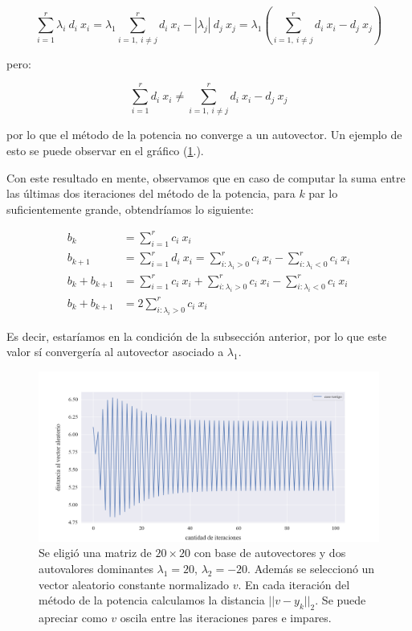 \begin{equation*}
    \sum_{i=1}^{r} \lambda_i\ d_i\ x_i = \lambda_1 \sum_{i = 1,\ i \neq j}^{r} d_i\ x_i - |\lambda_j|\ d_j\ x_j = \lambda_1 (\sum_{i = 1,\ i \neq j}^{r} d_i\ x_i - d_j\ x_j)
\end{equation*}

\vspace{1em} 
\noindent pero:

\begin{equation*}
    \sum_{i=1}^{r} d_i\ x_i \neq \sum_{i = 1,\ i \neq j}^{r} d_i\ x_i - d_j\ x_j
\end{equation*}

\vspace{1em}
\noindent por lo que el método de la potencia no converge a un autovector. 
Un ejemplo de esto se puede observar en el gráfico (\ref{fig:oscilante}.).

\vspace{1em}
Con este resultado en mente, observamos que en caso de computar la suma entre las últimas dos iteraciones del método de la potencia, para $k$ par lo suficientemente grande, obtendríamos lo siguiente:

\vspace{1em}
\begin{align*}
    b_k &= \sum_{i=1}^{r} c_i\ x_i \\
    b_{k+1} &= \sum_{i=1}^{r} d_i\ x_i = \sum_{i: \lambda_i > 0}^{r} c_i\ x_i - \sum_{i: \lambda_i < 0}^{r} c_i\ x_i \\ 
    b_k + b_{k+1} &= \sum_{i=1}^{r} c_i\ x_i + \sum_{i: \lambda_i > 0}^{r} c_i\ x_i - \sum_{i: \lambda_i < 0}^{r} c_i\ x_i   \\ 
    b_k + b_{k+1} &= 2 \sum_{i: \lambda_i > 0}^{r} c_i\ x_i
\end{align*}

\vspace{1em}
Es decir, estaríamos en la condición de la subsección anterior, por lo que este valor sí convergería al autovector asociado a $\lambda_1$.

\begin{figure}[!htbp]
    \includegraphics[scale=0.45]{files/src/.media/op_oscilante.png}
    \caption{Se eligió una matriz de $20 \times 20$ con base de autovectores y dos autovalores dominantes $\lambda_1 = 20$, $\lambda_2 = -20$. Además se seleccionó un vector aleatorio constante normalizado $v$. En cada iteración del método de la potencia calculamos la distancia $||v - y_k||_2$. Se puede apreciar como $v$ oscila entre las iteraciones pares e impares.}
    \label{fig:oscilante}
\end{figure}

